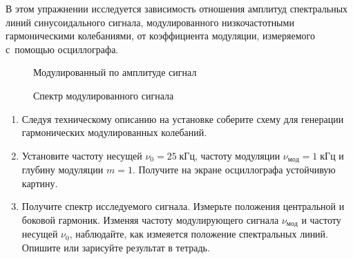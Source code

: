 \begin{lab:task}



В этом упражнении исследуется зависимость отношения амплитуд спектральных линий
синусоидального сигнала, модулированного низкочастотными гармоническими
колебаниями, от коэффициента модуляции, измеряемого с~помощью осциллографа.

\begin{figure}[h!]
\hfil\hfil
\begin{minipage}{0.4\textwidth}
    \caption{Модулированный по амплитуде сигнал}
\end{minipage}
\hfil
\begin{minipage}{0.4\textwidth}
    \caption{Спектр модулированного сигнала}
\end{minipage}
\end{figure}

\begin{enumerate}
\item Следуя техническому описанию на установке соберите схему для
генерации гармонических модулированных колебаний.

\item Установите частоту несущей $\nu_0=25\;кГц$, частоту модуляции
$\nu_{мод} = 1\;кГц$ и глубину модуляции $m=1$.
Получите на экране осциллографа устойчивую картину.

\item Получите спектр исследуемого сигнала. Измерьте положения центральной
и боковой гармоник. Изменяя частоту модулирующего сигнала $\nu_{мод}$
и частоту несущей $\nu_0$, наблюдайте, как измеяется положение спектральных линий.
Опишите или зарисуйте результат в тетрадь.


\end{enumerate}
\end{lab:task}
